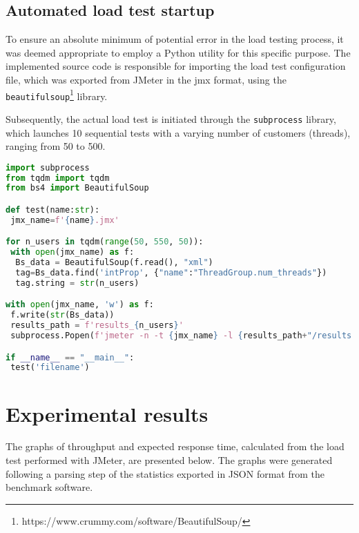 \subsection{Automated load test startup}

To ensure an absolute minimum of potential error in the load testing process, it was deemed appropriate to employ a Python utility for this specific purpose. 
The implemented source code is responsible for importing the load test configuration file, which was exported from JMeter in the jmx format, using the \verb|beautifulsoup|\footnote[2]{https://www.crummy.com/software/BeautifulSoup/} library.

Subsequently, the actual load test is initiated through the \verb|subprocess| library, which launches 10 sequential tests with a varying number of customers (threads), ranging from 50 to 500.

\vspace{8mm}

\begin{lstlisting}[language=Python, caption={Python script for automated load test startup}, label={lst:python-script}]
import subprocess
from tqdm import tqdm
from bs4 import BeautifulSoup

def test(name:str):
 jmx_name=f'{name}.jmx'

for n_users in tqdm(range(50, 550, 50)):      
 with open(jmx_name) as f:
  Bs_data = BeautifulSoup(f.read(), "xml")
  tag=Bs_data.find('intProp', {"name":"ThreadGroup.num_threads"})
  tag.string = str(n_users)

with open(jmx_name, 'w') as f:
 f.write(str(Bs_data))
 results_path = f'results_{n_users}'
 subprocess.Popen(f'jmeter -n -t {jmx_name} -l {results_path+"/results.csv"} -e -o {results_path}', shell=True, stdout=subprocess.DEVNULL).wait()

if __name__ == "__main__":
 test('filename')
\end{lstlisting}

\section{Experimental results}

The graphs of throughput and expected response time, calculated from the load test performed with JMeter, are presented below.
The graphs were generated following a parsing step of the statistics exported in JSON format from the benchmark software.

\clearpage

